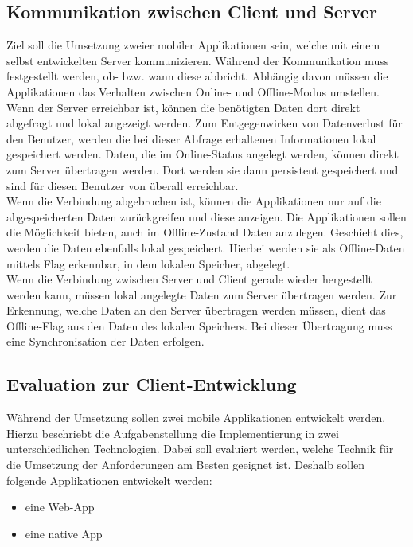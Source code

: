 \subsection{Kommunikation zwischen Client und Server}
\label{ssec:kommunikation-client-server}
Ziel soll die Umsetzung zweier mobiler Applikationen sein, welche mit einem selbst entwickelten Server kommunizieren. Während der Kommunikation muss festgestellt werden, ob- bzw. wann diese abbricht. Abhängig davon müssen die Applikationen das Verhalten zwischen Online- und Offline-Modus umstellen. \\
Wenn der Server erreichbar ist, können die benötigten Daten dort direkt abgefragt und lokal angezeigt werden. Zum Entgegenwirken von Datenverlust für den Benutzer, werden die bei dieser Abfrage erhaltenen Informationen lokal gespeichert werden. Daten, die im Online-Status angelegt werden, können direkt zum Server übertragen werden. Dort werden sie dann persistent gespeichert und sind für diesen Benutzer von überall erreichbar.\\
Wenn die Verbindung abgebrochen ist, können die Applikationen nur auf die abgespeicherten Daten zurückgreifen und diese anzeigen. Die Applikationen sollen die Möglichkeit bieten, auch im Offline-Zustand Daten anzulegen. Geschieht dies, werden die Daten ebenfalls lokal gespeichert. Hierbei werden sie als Offline-Daten mittels Flag erkennbar, in dem lokalen Speicher, abgelegt.\\
Wenn die Verbindung zwischen Server und Client gerade wieder hergestellt werden kann, müssen lokal angelegte Daten zum Server übertragen werden. Zur Erkennung, welche Daten an den Server übertragen werden müssen, dient das Offline-Flag aus den Daten des lokalen Speichers. Bei dieser Übertragung muss eine Synchronisation der Daten erfolgen. 
\subsection{Evaluation zur Client-Entwicklung}
\label{ssec:evaluation-client-entwicklung}
Während der Umsetzung sollen zwei mobile Applikationen entwickelt werden.  Hierzu beschriebt die Aufgabenstellung die Implementierung in zwei unterschiedlichen Technologien. Dabei soll evaluiert werden, welche Technik für die Umsetzung der Anforderungen am Besten geeignet ist. Deshalb sollen folgende Applikationen entwickelt werden: 
\begin{itemize}
\item eine \ac{Web-App}
\item eine native App 
\end{itemize}
